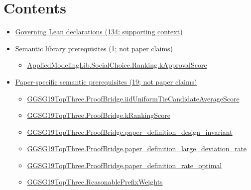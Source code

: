 \documentclass[10pt]{article}
\begin{document}
\section*{Contents}
\begin{itemize}[leftmargin=1.2em]
\item \hyperlink{governing-declaration-section-5ef5ef0364b6939c}{Governing Lean declarations (134; supporting context)}
\item \hyperlink{library-section-5cc46fc24f07d5d8}{Semantic library prerequisites (1; not paper claims)}
\begin{itemize}[leftmargin=1.2em]
\item \hyperlink{library-prerequisite-7bd7554e4e6afba2}{Applied\allowbreak{}Modeling\allowbreak{}Lib.\allowbreak{}Social\allowbreak{}Choice.\allowbreak{}Ranking.\allowbreak{}k\allowbreak{}Approval\allowbreak{}Score}
\end{itemize}
\item \hyperlink{paper-prerequisite-section-5ef5ef0364b6939c}{Paper-specific semantic prerequisites (19; not paper claims)}
\begin{itemize}[leftmargin=1.2em]
\item \hyperlink{paper-prerequisite-d3d54108287a800b}{GGSG19\allowbreak{}Top\allowbreak{}Three.\allowbreak{}Proof\allowbreak{}Bridge.\allowbreak{}iid\allowbreak{}Uniform\allowbreak{}Tie\allowbreak{}Candidate\allowbreak{}Average\allowbreak{}Score}
\item \hyperlink{paper-prerequisite-78f78f92d72c4911}{GGSG19\allowbreak{}Top\allowbreak{}Three.\allowbreak{}Proof\allowbreak{}Bridge.\allowbreak{}k\allowbreak{}Ranking\allowbreak{}Score}
\item \hyperlink{paper-prerequisite-482b67cd8adbac6d}{GGSG19\allowbreak{}Top\allowbreak{}Three.\allowbreak{}Proof\allowbreak{}Bridge.\allowbreak{}paper\_\allowbreak{}definition\_\allowbreak{}design\_\allowbreak{}invariant}
\item \hyperlink{paper-prerequisite-957d14348455dc56}{GGSG19\allowbreak{}Top\allowbreak{}Three.\allowbreak{}Proof\allowbreak{}Bridge.\allowbreak{}paper\_\allowbreak{}definition\_\allowbreak{}large\_\allowbreak{}deviation\_\allowbreak{}rate}
\item \hyperlink{paper-prerequisite-e57d0b28db657e01}{GGSG19\allowbreak{}Top\allowbreak{}Three.\allowbreak{}Proof\allowbreak{}Bridge.\allowbreak{}paper\_\allowbreak{}definition\_\allowbreak{}rate\_\allowbreak{}optimal}
\item \hyperlink{paper-prerequisite-eb089112dcbf93d9}{GGSG19\allowbreak{}Top\allowbreak{}Three.\allowbreak{}Reasonable\allowbreak{}Prefix\allowbreak{}Weights}

\end{itemize}
\end{itemize}
\end{document}
